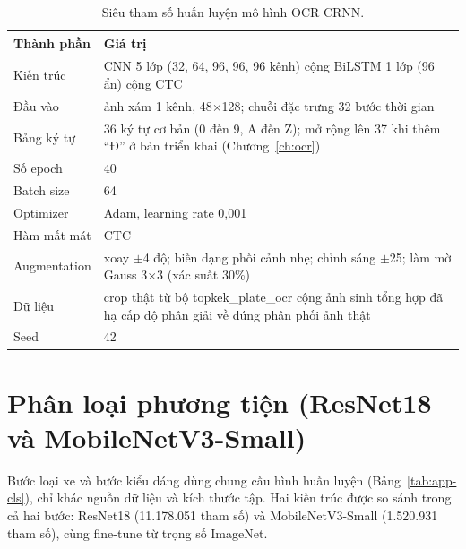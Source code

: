 \begin{table}[htbp]
\centering
\caption{Siêu tham số huấn luyện mô hình OCR CRNN.}
\label{tab:app-ocr}

\vspace{4pt}
\begin{tabular}{@{}p{5cm}p{8.5cm}@{}}
\toprule
\textbf{Thành phần} & \textbf{Giá trị} \\
\midrule
Kiến trúc & CNN 5 lớp (32, 64, 96, 96, 96 kênh) cộng BiLSTM 1 lớp (96 ẩn) cộng CTC \\
Đầu vào & ảnh xám 1 kênh, 48$\times$128; chuỗi đặc trưng 32 bước thời gian \\
Bảng ký tự & 36 ký tự cơ bản (0 đến 9, A đến Z); mở rộng lên 37 khi thêm ``Đ'' ở bản triển khai (Chương~\ref{ch:ocr}) \\
Số epoch & 40 \\
Batch size & 64 \\
Optimizer & Adam, learning rate 0,001 \\
Hàm mất mát & CTC \\
Augmentation & xoay $\pm$4 độ; biến dạng phối cảnh nhẹ; chỉnh sáng $\pm$25; làm mờ Gauss 3$\times$3 (xác suất 30\%) \\
Dữ liệu & crop thật từ bộ topkek\_plate\_ocr cộng ảnh sinh tổng hợp đã hạ cấp độ phân giải về đúng phân phối ảnh thật \\
Seed & 42 \\
\bottomrule
\end{tabular}
\end{table}

\section{Phân loại phương tiện (ResNet18 và MobileNetV3-Small)}

Bước loại xe và bước kiểu dáng dùng chung cấu hình huấn luyện (Bảng~\ref{tab:app-cls}), chỉ khác nguồn dữ liệu và kích thước tập. Hai kiến trúc được so sánh trong cả hai bước: ResNet18 (11.178.051 tham số) và MobileNetV3-Small (1.520.931 tham số), cùng fine-tune từ trọng số ImageNet.

